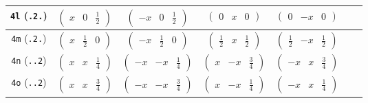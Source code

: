 \documentclass[fleqn,9pt,landscape]{jsarticle}
\begin{document}
\begin{center}
\begin{longtable}{ccccccc}
{\tt 4l} ({\tt .2.}) & $ \begin{pmatrix} x & 0 & \frac{1}{2} \end{pmatrix} $ & $ \begin{pmatrix} - x & 0 & \frac{1}{2} \end{pmatrix} $ & $ \begin{pmatrix} 0 & x & 0 \end{pmatrix} $ & $ \begin{pmatrix} 0 & - x & 0 \end{pmatrix} $ & $  $ & $  $ \\ \hline
{\tt 4m} ({\tt .2.}) & $ \begin{pmatrix} x & \frac{1}{2} & 0 \end{pmatrix} $ & $ \begin{pmatrix} - x & \frac{1}{2} & 0 \end{pmatrix} $ & $ \begin{pmatrix} \frac{1}{2} & x & \frac{1}{2} \end{pmatrix} $ & $ \begin{pmatrix} \frac{1}{2} & - x & \frac{1}{2} \end{pmatrix} $ & $  $ & $  $ \\ \hline
{\tt 4n} ({\tt ..2}) & $ \begin{pmatrix} x & x & \frac{1}{4} \end{pmatrix} $ & $ \begin{pmatrix} - x & - x & \frac{1}{4} \end{pmatrix} $ & $ \begin{pmatrix} x & - x & \frac{3}{4} \end{pmatrix} $ & $ \begin{pmatrix} - x & x & \frac{3}{4} \end{pmatrix} $ & $  $ & $  $ \\ \hline
{\tt 4o} ({\tt ..2}) & $ \begin{pmatrix} x & x & \frac{3}{4} \end{pmatrix} $ & $ \begin{pmatrix} - x & - x & \frac{3}{4} \end{pmatrix} $ & $ \begin{pmatrix} x & - x & \frac{1}{4} \end{pmatrix} $ & $ \begin{pmatrix} - x & x & \frac{1}{4} \end{pmatrix} $ & $  $ & $  $ \\ \hline

\end{longtable}
\end{center}
\end{document}
